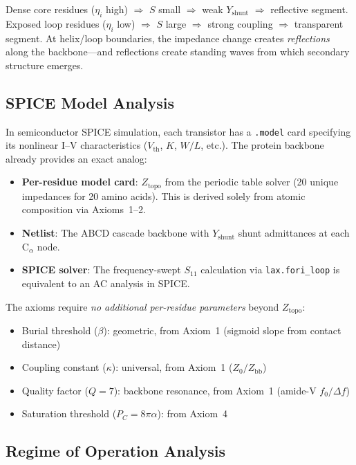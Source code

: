 \noindent Dense core residues ($\eta_i$ high) $\Rightarrow$ $S$ small $\Rightarrow$ weak $Y_\text{shunt}$ $\Rightarrow$ reflective segment.  Exposed loop residues ($\eta_i$ low) $\Rightarrow$ $S$ large $\Rightarrow$ strong coupling $\Rightarrow$ transparent segment.  At helix/loop boundaries, the impedance change creates \emph{reflections} along the backbone---and reflections create standing waves from which secondary structure emerges.

\subsection{SPICE Model Analysis}
\label{sec:spice_models}

In semiconductor SPICE simulation, each transistor has a \texttt{.model} card specifying its nonlinear I--V characteristics ($V_\text{th}$, $K$, $W/L$, etc.).  The protein backbone already provides an exact analog:

\begin{itemize}
    \item \textbf{Per-residue model card}: $Z_\text{topo}$ from the periodic table solver (20 unique impedances for 20 amino acids).  This is derived solely from atomic composition via Axioms~1--2.
    \item \textbf{Netlist}: The ABCD cascade backbone with $Y_\text{shunt}$ shunt admittances at each C$_\alpha$ node.
    \item \textbf{SPICE solver}: The frequency-swept $S_{11}$ calculation via \texttt{lax.fori\_loop} is equivalent to an AC analysis in SPICE.
\end{itemize}

\noindent The axioms require \emph{no additional per-residue parameters} beyond $Z_\text{topo}$:
\begin{itemize}
    \item Burial threshold ($\beta$): geometric, from Axiom~1 (sigmoid slope from contact distance)
    \item Coupling constant ($\kappa$): universal, from Axiom~1 ($Z_0 / Z_\text{bb}$)
    \item Quality factor ($Q = 7$): backbone resonance, from Axiom~1 (amide-V $f_0/\Delta f$)
    \item Saturation threshold ($P_C = 8\pi\alpha$): from Axiom~4
\end{itemize}

\subsection{Regime of Operation Analysis}
\label{sec:regime_analysis}

